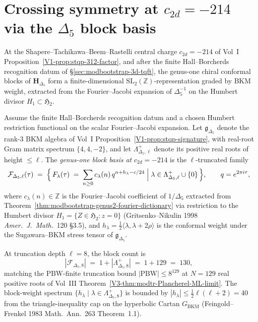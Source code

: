 \section{Crossing symmetry at $c_{2d} = -214$ via the $\Delta_5$ block basis}
\label{sec:modbootstrap-cross-minus214}

At the Shapere--Tachikawa--Beem--Rastelli central charge
$c_{2d} = -214$ of
Vol~I Proposition~\ref{V1-prop:stqp-312-factor}, and after the finite
Hall--Borcherds recognition datum of
\S\ref{sec:modbootstrap-3d-tqft}, the genus-one chiral conformal
blocks of $\mathbf H_{\Delta_5}$ form a
finite-dimensional $\mathrm{SL}_2(\mathbb Z)$-representation
graded by BKM weight, extracted from the Fourier--Jacobi expansion
of $\Delta_5^{-1}$ on the Humbert divisor $H_1 \subset\mathfrak H_2$.

\begin{definition}[Conformal-block basis $F_\lambda(\tau)$ at
$c_{2d} = -214$]
\label{def:modbootstrap-cross-block-basis}
Assume the finite Hall--Borcherds recognition datum and a chosen
Humbert restriction functional on the scalar Fourier--Jacobi expansion.
Let $\mathfrak g_{\Delta_5}$ denote the rank-$3$ BKM algebra of
Vol~I Proposition~\ref{V1-prop:stqp-signature}, with
real-root Gram matrix spectrum $\{4, 4, -2\}$, and let
$\Lambda^{+}_{\Delta_5, \ell}$ denote its positive real roots
of height $\leq\ell$. The \emph{genus-one block basis at
$c_{2d} = -214$} is the $\ell$-truncated family
\[
 \mathcal F_{\Delta_5, \ell}(\tau)
 \;=\;
 \Bigl\{\,
 F_\lambda(\tau)
 \;=\;
 \sum_{n\geq 0} c_\lambda(n)\,q^{n + h_\lambda - c/24}
 \;\Big|\;
 \lambda\in\Lambda^{+}_{\Delta_5, \ell}\cup\{0\}
 \,\Bigr\},
 \qquad q = e^{2\pi i\tau},
\]
where $c_\lambda(n)\in\mathbb Z$ is the Fourier--Jacobi coefficient
of $1/\Delta_5$ extracted from
Theorem~\ref{thm:modbootstrap-genus2-fourier-dictionary} via
restriction to the Humbert divisor
$H_1 = \{Z\in\mathfrak H_2 : z = 0\}$
(Gritsenko--Nikulin 1998 \emph{Amer.~J.~Math.}~120 \S 3.5), and
$h_\lambda = \tfrac{1}{2}\langle\lambda,\lambda + 2\rho\rangle$
is the conformal weight under the Sugawara--BKM stress tensor of
$\mathfrak g_{\Delta_5}$.
\end{definition}

\begin{proposition}[Block count at truncation $\ell = 8$;
\ClaimStatusConditional]
\label{prop:modbootstrap-cross-block-count}
At truncation depth $\ell = 8$, the block count is
\[
 |\mathcal F_{\Delta_5, 8}| \;=\; 1 + |\Lambda^{+}_{\Delta_5, 8}|
 \;=\; 1 + 129 \;=\; 130,
\]
matching the PBW-finite truncation bound
$|\mathrm{PBW}| \leq 8^{129}$ at $N = 129$ real positive roots
of Vol~III Theorem~\ref{V3-thm:modtr-Plancherel-ML-limit}.
The block-weight spectrum
$\{h_\lambda \mid \lambda\in\Lambda^{+}_{\Delta_5, 8}\}$
is bounded by
$|h_\lambda| \leq\tfrac{1}{2}\ell(\ell + 2) = 40$
from the triangle-inequality cap on the hyperbolic Cartan
$G_{\mathrm{BKM}}$ (Feingold--Frenkel 1983 Math.~Ann.~263
Theorem~1.1).
\end{proposition}

